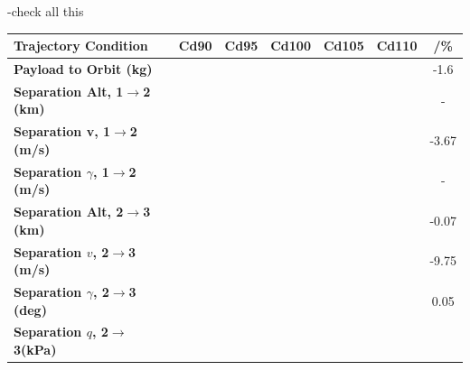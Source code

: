 -check all this

\begin{table}[ht]
	\centering
	\begin{tabular}{l c c c c c c} 
		\hline \textbf{Trajectory Condition}
		&Cd90
		&Cd95
		&Cd100
		&Cd105
		&Cd110
		& /\%
		\\
		\hline \textbf{Payload to Orbit (kg)}
		& \PayloadToOrbitCdNinety
		& \PayloadToOrbitCdNinetyFive
		& \PayloadToOrbitCdStandard
		& \PayloadToOrbitCdOneHundredFive
		& \PayloadToOrbitCdOneHundredTen
		&-1.6
		\\
		\textbf{Separation Alt, 1$\rightarrow$2 (km)}
		& \firstsecondSeparationAltCdNinety
		& \firstsecondSeparationAltCdNinetyFive
		& \firstsecondSeparationAltCdStandard
		& \firstsecondSeparationAltCdOneHundredFive
		& \firstsecondSeparationAltCdOneHundredTen
		& -
		\\
		\textbf{Separation v, 1$\rightarrow$2 (m/s)}
		& \firstsecondSeparationvCdNinety
		& \firstsecondSeparationvCdNinetyFive
		& \firstsecondSeparationvCdStandard
		& \firstsecondSeparationvCdOneHundredFive
		& \firstsecondSeparationvCdOneHundredTen
		&-3.67
		\\
		\textbf{Separation $\gamma$, 1$\rightarrow$2 (m/s)}
		& \firstsecondSeparationgammaCdNinety
		& \firstsecondSeparationgammaCdNinetyFive
		& \firstsecondSeparationgammaCdStandard
		& \firstsecondSeparationgammaCdOneHundredFive
		& \firstsecondSeparationgammaCdOneHundredTen
		& -
		\\
		\textbf{Separation Alt, 2$\rightarrow$3 (km)}
		& \secondthirdSeparationAltCdNinety
		& \secondthirdSeparationAltCdNinetyFive
		& \secondthirdSeparationAltCdStandard
		& \secondthirdSeparationAltCdOneHundredFive
		& \secondthirdSeparationAltCdOneHundredTen
		&-0.07
		\\
		\textbf{Separation $v$, 2$\rightarrow$3 (m/s)}
		& \secondthirdSeparationvCdNinety
		& \secondthirdSeparationvCdNinetyFive
		& \secondthirdSeparationvCdStandard
		& \secondthirdSeparationvCdOneHundredFive
		& \secondthirdSeparationvCdOneHundredTen
		&-9.75
		\\
		\textbf{Separation $\gamma$, 2$\rightarrow$3 (deg)}
		& \secondthirdSeparationgammaCdNinety
		& \secondthirdSeparationgammaCdNinetyFive
		& \secondthirdSeparationgammaCdStandard
		& \secondthirdSeparationgammaCdOneHundredFive
		& \secondthirdSeparationgammaCdOneHundredTen
		&0.05
		\\
		\textbf{Separation $q$, 2$\rightarrow$3(kPa)}
		& \secondthirdSeparationqCdNinety
		& \secondthirdSeparationqCdNinetyFive
		& \secondthirdSeparationqCdStandard

\end{tabular}
\end{table}
